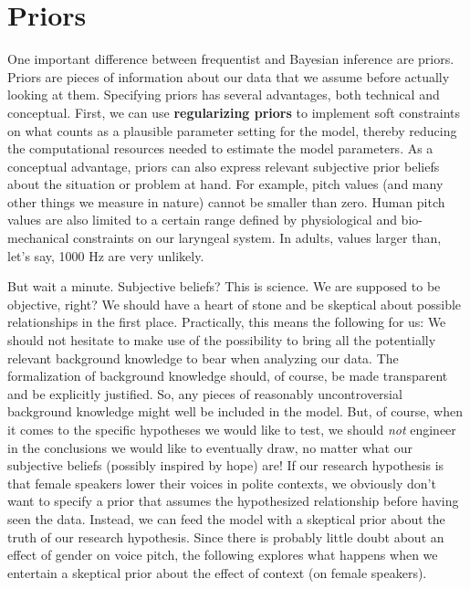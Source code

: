 \documentclass[nobib]{tufte-handout}
\begin{document}
%

\section{Priors}

One important difference between frequentist and Bayesian inference are priors. Priors are pieces of information about our data that we assume before actually looking at them. Specifying priors has several advantages, both technical and conceptual. First, we can use \textbf{regularizing priors} to implement soft constraints on what counts as a plausible parameter setting for the model, thereby reducing the computational resources needed to estimate the model parameters.
%
%
As a conceptual advantage, priors can also express relevant subjective prior beliefs about the situation or problem at hand. For example, pitch values (and many other things we measure in nature) cannot be smaller than zero. Human pitch values are also limited to a certain range defined by physiological and bio-mechanical constraints on our laryngeal system. In adults, values larger than, let's say, 1000 Hz are very unlikely. 
 
But wait a minute. Subjective beliefs? This is science. We are supposed to be objective, right?
We should have a heart of stone and be skeptical about possible relationships in the first
place. Practically, this means the following for us: We should not hesitate to make use of the
possibility to bring all the potentially relevant background knowledge to bear when analyzing
our data. The formalization of background knowledge should, of course, be made transparent and
be explicitly justified. So, any pieces of reasonably uncontroversial background knowledge
might well be included in the model. But, of course, when it comes to the specific hypotheses
we would like to test, we should \emph{not} engineer in the conclusions we would like to
eventually draw, no matter what our subjective beliefs (possibly inspired by hope) are! If our
research hypothesis is that female speakers lower their voices in polite contexts, we obviously
don't want to specify a prior that assumes the hypothesized relationship before having seen the
data. Instead, we can feed the model with a skeptical prior about the truth of our
research hypothesis. Since there is probably little doubt about an effect of gender on voice
pitch, the following explores what happens when we entertain a skeptical prior about the effect
of context (on female speakers).
\end{document}
